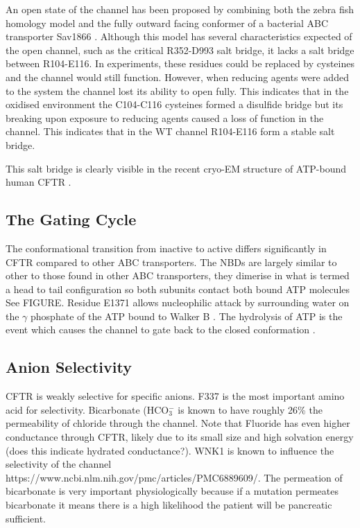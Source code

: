 An open state of the channel has been proposed by combining both the zebra fish homology model and the fully outward facing conformer of a bacterial ABC transporter Sav1866 \cite{Hoffmann2018}. Although this model has several characteristics expected of the open channel, such as the critical R352-D993 salt bridge, it lacks a salt bridge between R104-E116. In experiments, these residues could be replaced by cysteines and the channel would still function. However, when reducing agents were added to the system the channel lost its ability to open fully. This indicates that in the oxidised environment the C104-C116 cysteines formed a disulfide bridge but its breaking upon exposure to reducing agents caused a loss of function in the channel. This indicates that in the WT channel R104-E116 form a stable salt bridge. 

This salt bridge is clearly visible in the recent cryo-EM structure of ATP-bound human CFTR \cite{zhang2018}.

\subsection{The Gating Cycle}
The conformational transition from inactive to active differs significantly in CFTR compared to other ABC transporters. The NBDs are largely similar to other to those found in other ABC transporters, they dimerise in what is termed a head to tail configuration so both subunits contact both bound ATP molecules \cite{} See FIGURE. Residue E1371 allows nucleophilic attack by surrounding water on the $\gamma$ phosphate  of the ATP bound to Walker B \cite{Stratford2007}. The hydrolysis of ATP is the event which causes the channel to gate back to the closed conformation \cite{}. 

\subsection {Anion Selectivity}
CFTR is weakly selective for specific anions. F337 is the most important amino acid for selectivity. Bicarbonate (HCO$_3^-$ is known to have roughly 26\% the permeability of chloride through the channel. Note that Fluoride has even higher conductance through CFTR, likely due to its small size and high solvation energy (does this indicate hydrated conductance?). WNK1 is known to influence the selectivity of the channel https://www.ncbi.nlm.nih.gov/pmc/articles/PMC6889609/. The permeation of bicarbonate is very important physiologically because if a mutation permeates bicarbonate it means there is a high likelihood the patient will be pancreatic sufficient. 

